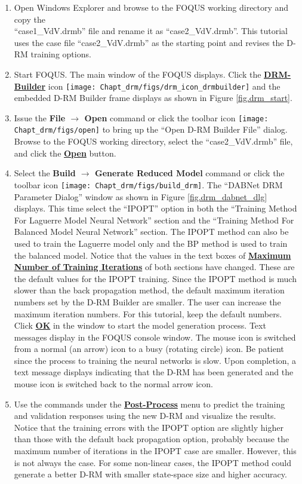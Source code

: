 \begin{enumerate}
	\item Open Windows Explorer and browse to the FOQUS working directory and copy the \\``case1\_VdV.drmb'' file and rename it as ``case2\_VdV.drmb''.  This tutorial uses the case file ``case2\_VdV.drmb'' as the starting point and revises the D-RM training options.
	\item Start FOQUS.  The main window of the FOQUS displays.  Click the \textbf{\underline{DRM-Builder}} icon \texttt{[image: Chapt\_drm/figs/drm\_icon\_drmbuilder]} and the embedded D-RM Builder frame displays as shown in Figure \ref{fig.drm_start}.
	\item Issue the \textbf{File $\rightarrow$ Open} command or click the toolbar icon \texttt{[image: Chapt\_drm/figs/open]} to bring up the ``Open D-RM Builder File'' dialog. Browse to the FOQUS working directory, select the ``case2\_VdV.drmb'' file, and click the \textbf{\underline{Open}} button.
	\item Select the \textbf{Build $\rightarrow$ Generate Reduced Model} command or click the toolbar icon \texttt{[image: Chapt\_drm/figs/build\_drm]}.  The ``DABNet DRM Parameter Dialog'' window as shown in Figure \ref{fig.drm_dabnet_dlg} displays.  This time select the ``IPOPT'' option in both the ``Training Method For Laguerre Model Neural Network'' section and the ``Training Method For Balanced Model Neural Network'' section.  The IPOPT method can also be used to train the Laguerre model only and the BP method is used to train the balanced model.  Notice that the values in the text boxes of \textbf{\underline{Maximum Number of Training Iterations}} of both sections have changed.  These are the default values for the IPOPT training.  Since the IPOPT method is much slower than the back propagation method, the default maximum iteration numbers set by the D-RM Builder are smaller.  The user can increase the maximum iteration numbers.  For this tutorial, keep the default numbers.  Click \textbf{\underline{OK}} in the window to start the model generation process.  Text messages display in the FOQUS console window.  The mouse icon is switched from a normal (an arrow) icon to a busy (rotating circle) icon.  Be patient since the process to training the neural networks is slow.  Upon completion, a text message displays indicating that the D-RM has been generated and the mouse icon is switched back to the normal arrow icon.
	\item Use the commands under the \textbf{\underline{Post-Process}} menu to predict the training and validation responses using the new D-RM and visualize the results.  Notice that the training errors with the IPOPT option are slightly higher than those with the default back propagation option, probably because the maximum number of iterations in the IPOPT case are smaller.  However, this is not always the case.  For some non-linear cases, the IPOPT method could generate a better D-RM with smaller state-space size and higher accuracy.

\end{enumerate}
